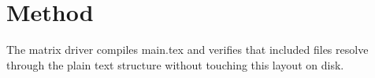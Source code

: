 \section{Method}
The matrix driver compiles main.tex and verifies that included files resolve
through the plain text structure without touching this layout on disk.
